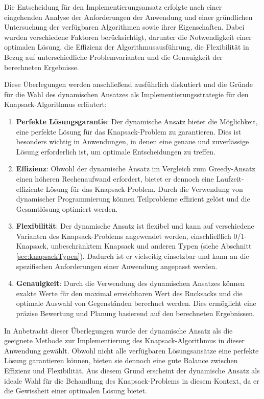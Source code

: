 \begin{itemize}
Die Entscheidung für den Implementierungsansatz erfolgte nach einer eingehenden Analyse der Anforderungen der Anwendung
und einer gründlichen Untersuchung der verfügbaren Algorithmen sowie ihrer Eigenschaften. Dabei wurden verschiedene
Faktoren berücksichtigt, darunter die Notwendigkeit einer optimalen Lösung, die Effizienz der Algorithmusausführung, die
Flexibilität in Bezug auf unterschiedliche Problemvarianten und die Genauigkeit der berechneten Ergebnisse.

Diese Überlegungen werden anschließend ausführlich diskutiert und die Gründe für die Wahl des dynamischen Ansatzes als
Implementierungsstrategie für den Knapsack-Algorithmus erläutert:
\begin{enumerate}
\item \textbf{Perfekte Lösungsgarantie}: Der dynamische Ansatz bietet die Möglichkeit, eine perfekte Lösung für das
Knapsack-Problem zu garantieren. Dies ist besonders wichtig in Anwendungen, in denen eine genaue und zuverlässige
Lösung erforderlich ist, um optimale Entscheidungen zu treffen.
\item \textbf{Effizienz}: Obwohl der dynamische Ansatz im Vergleich zum Greedy-Ansatz einen höheren Rechenaufwand
erfordert, bietet er dennoch eine Laufzeit-effiziente Lösung für das Knapsack-Problem. Durch die Verwendung von dynamischer
Programmierung können Teilprobleme effizient gelöst und die Gesamtlösung optimiert werden.
\item \textbf{Flexibilität}: Der dynamische Ansatz ist flexibel und kann auf verschiedene Varianten des Knapsack-Problems
angewendet werden, einschließlich 0/1-Knapsack, unbeschränktem Knapsack und anderen Typen (siehe Abschnitt \ref{sec:knapsackTypen}). Dadurch ist er vielseitig
einsetzbar und kann an die spezifischen Anforderungen einer Anwendung angepasst werden.
\item \textbf{Genauigkeit}: Durch die Verwendung des dynamischen Ansatzes können exakte Werte für den maximal erreichbaren
Wert des Rucksacks und die optimale Auswahl von Gegenständen berechnet werden. Dies ermöglicht eine präzise Bewertung
und Planung basierend auf den berechneten Ergebnissen.
\end{enumerate}

In Anbetracht dieser Überlegungen wurde der dynamische Ansatz als die geeignete Methode zur Implementierung des Knapsack-Algorithmus
in dieser Anwendung gewählt. Obwohl nicht alle verfügbaren Lösungsansätze eine perfekte Lösung garantieren können, bieten
sie dennoch eine gute Balance zwischen Effizienz und Flexibilität. Aus diesem Grund erscheint der dynamische Ansatz als
ideale Wahl für die Behandlung des Knapsack-Problems in diesem Kontext, da er die Gewissheit einer optimalen Lösung bietet.


\end{itemize}
